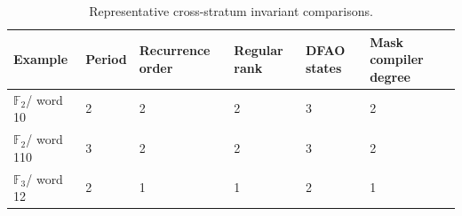 \begin{table}[htbp]
\centering
\caption{Representative cross-stratum invariant comparisons.}
\label{tab:block13-examples}
\scriptsize
\begin{tabularx}{\textwidth}{@{}L{0.15\textwidth}L{0.12\textwidth}L{0.13\textwidth}L{0.13\textwidth}L{0.13\textwidth}Y@{}}
\toprule
Example & Period & Recurrence order & Regular rank & DFAO states & Mask compiler degree\\
\midrule
$\mathbb {F}_2$/ word 10 & 2 & 2 & 2 & 3 & 2\\
$\mathbb {F}_2$/ word 110 & 3 & 2 & 2 & 3 & 2\\
$\mathbb {F}_3$/ word 12 & 2 & 1 & 1 & 2 & 1\\
\bottomrule
\end{tabularx}
\end{table}
